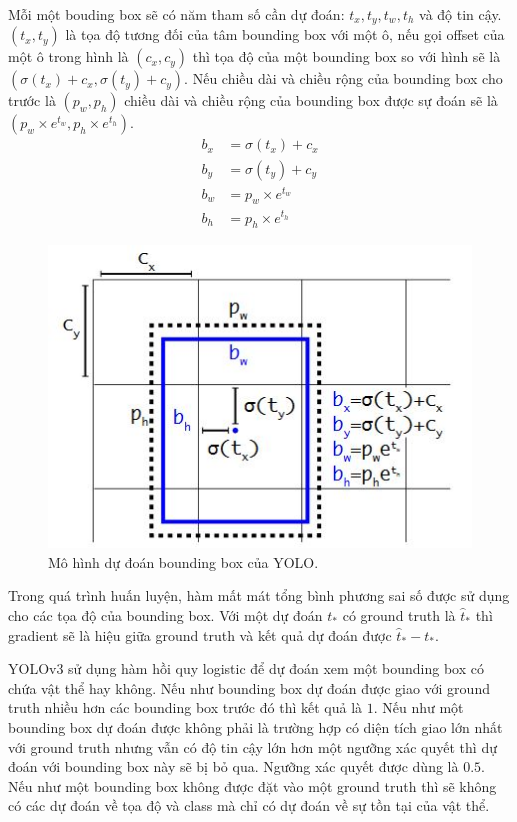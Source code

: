 Mỗi một bouding box sẽ có năm tham số cần dự đoán: $t_x,t_y,t_w,t_h$ và độ tin cậy. $(t_x,t_y)$ là tọa độ tương đối của tâm bounding box với một ô, nếu gọi offset của một ô trong hình là $(c_x,c_y)$ thì tọa độ của một bounding box so với hình sẽ là $(\sigma \left( t_x \right)+c_x,\sigma \left( t_y \right)+c_y)$. Nếu chiều dài và chiều rộng của bounding box cho trước là $\left( p_w,p_h \right)$ chiều dài và chiều rộng của bounding box được sự đoán sẽ là $\left( p_w \times e^{t_w},p_h \times e^{t_h} \right)$.
\begin{align*}
	b_x &= \sigma \left( t_x \right)+c_x\\
	b_y &= \sigma \left( t_y \right)+c_y\\
	b_w &= p_w \times e^{t_w}\\
	b_h &= p_h \times e^{t_h}
\end{align*}
\begin{figure}[ht!]
	\centerline{\includegraphics[scale=0.8]{images/bounding_box_prediction.jpg}}
  	\caption{Mô hình dự đoán bounding box của YOLO.}
  	\label{fig:bounding_box_prediction}
\end{figure}
Trong quá trình huấn luyện, hàm mất mát tổng bình phương sai số được sử dụng cho các tọa độ của bounding box. Với một dự đoán $t_*$ có ground truth là ${\widehat{t}}_*$ thì gradient sẽ là hiệu giữa ground truth và kết quả dự đoán được ${\widehat{t}}_* - t_*$.

YOLOv3 sử dụng hàm hồi quy logistic để dự đoán xem một bounding box có chứa vật thể hay không. Nếu như bounding box dự đoán được giao với ground truth nhiều hơn các bounding box trước đó thì kết quả là $1$. Nếu như một bounding box dự đoán được không phải là trường hợp có diện tích giao lớn nhất với ground truth nhưng vẫn có độ tin cậy lớn hơn một ngưỡng xác quyết thì dự đoán với bounding box này sẽ bị bỏ qua. Ngưỡng xác quyết được dùng là $0.5$. Nếu như một bounding box không được đặt vào một ground truth thì sẽ không có các dự đoán về tọa độ và class mà chỉ có dự đoán về sự tồn tại của vật thể.

